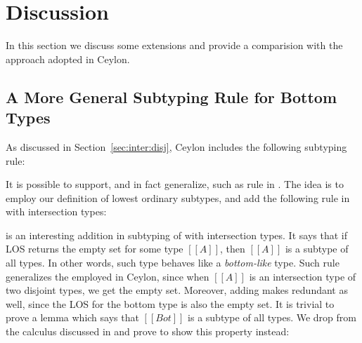 \section{Discussion}
\label{sec:discussion}
In this section we discuss some extensions and provide a comparision with the approach
adopted in Ceylon.

\subsection{A More General Subtyping Rule for Bottom  Types}
\label{sec:inter:refactoring}
As discussed in Section~\ref{sec:inter:disj}, Ceylon includes the following subtyping rule:

\begin{center}
\end{center}

\noindent It is possible to support, and in fact generalize, such as rule in \name. The idea is to
employ our definition of lowest ordinary subtypes, and add the following rule 
in \cal with intersection types:

\begin{center}
\end{center}

\noindent {} is an interesting addition in subtyping of \cal with intersection types.
It says that if LOS returns the empty set for some type $[[A]]$, then $[[A]]$
is a subtype of all types. In other words, such type behaves like a \emph{bottom-like} type.
Such rule generalizes the 
employed in Ceylon, since when $[[A]]$ is an intersection type of two
disjoint types, we get the empty set.
Moreover, adding  makes  redundant as well, since the LOS for
the bottom type is also the empty set. It is trivial to prove a lemma which says that $[[Bot]]$ is a subtype of all types. We drop  from the calculus discussed in 
and prove  to show this property instead:

